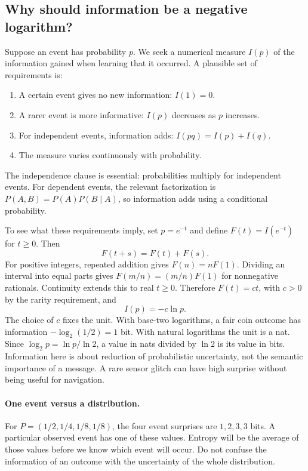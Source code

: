 \subsection{Why should information be a negative logarithm?}
Suppose an event has probability $p$. We seek a numerical measure $I(p)$ of the
information gained when learning that it occurred. A plausible set of
requirements is:
\begin{enumerate}
\item A certain event gives no new information: $I(1)=0$.
\item A rarer event is more informative: $I(p)$ decreases as $p$ increases.
\item For independent events, information adds: $I(pq)=I(p)+I(q)$.
\item The measure varies continuously with probability.
\end{enumerate}
The independence clause is essential: probabilities multiply for independent
events. For dependent events, the relevant factorization is
$P(A,B)=P(A)P(B\mid A)$, so information adds using a conditional probability.

To see what these requirements imply, set $p=e^{-t}$ and define
$F(t)=I(e^{-t})$ for $t\geq0$. Then
\[
F(t+s)=F(t)+F(s).
\]
For positive integers, repeated addition gives $F(n)=nF(1)$. Dividing an interval
into equal parts gives $F(m/n)=(m/n)F(1)$ for nonnegative rationals. Continuity
extends this to real $t\geq0$. Therefore $F(t)=ct$, with $c>0$ by the rarity
requirement, and
\[
\boxed{I(p)=-c\ln p.}
\]
The choice of $c$ fixes the unit. With base-two logarithms, a fair coin outcome
has information $-\log_2(1/2)=1$ bit. With natural logarithms the unit is a nat.
Since $\log_2 p=\ln p/\ln2$, a value in nats divided by $\ln2$ is its value in
bits. Information here is about reduction of probabilistic uncertainty, not the
semantic importance of a message. A rare sensor glitch can have high surprise
without being useful for navigation.

\paragraph{One event versus a distribution.}
For $P=(1/2,1/4,1/8,1/8)$, the four event surprises are $1,2,3,3$ bits.
A particular observed event has one of these values. Entropy will be the average
of those values before we know which event will occur. Do not confuse the
information of an outcome with the uncertainty of the whole distribution.

